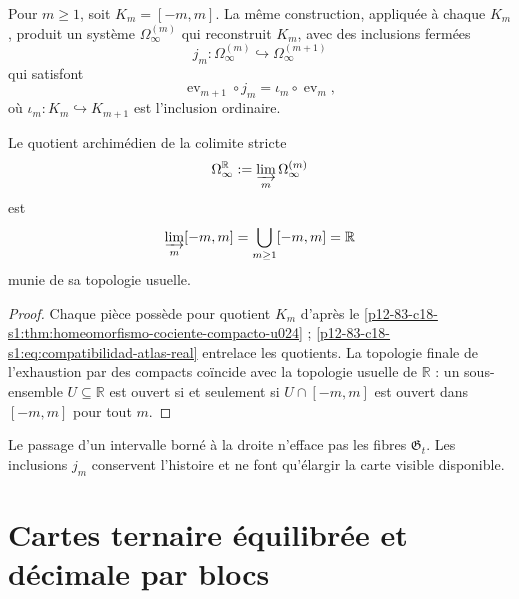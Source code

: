 Pour \(m\geq1\), soit \(K_m=[-m,m]\). La même construction, appliquée à chaque
\(K_m\), produit un système \(\Omega_\infty^{(m)}\) qui reconstruit
\(K_m\), avec des inclusions fermées
\begin{equation}
 j_m:\Omega_\infty^{(m)}\hookrightarrow
 \Omega_\infty^{(m+1)}
 \label{p12-83-c18-s1:eq:inclusion-atlas-genealogico}
\end{equation}
qui satisfont
\begin{equation}
 \operatorname{ev}_{m+1}\circ j_m
 =\iota_m\circ\operatorname{ev}_m,
 \label{p12-83-c18-s1:eq:compatibilidad-atlas-real}
\end{equation}
où \(\iota_m:K_m\hookrightarrow K_{m+1}\) est l'inclusion ordinaire.

\begin{proposition}
\label{p12-83-c18-s1:prop:agotamiento-recta-real-u024}
Le quotient archimédien de la colimite stricte
\begin{equation}
 \Omega_\infty^{\mathbb R}
 :=\varinjlim_m\Omega_\infty^{(m)}
 \label{p12-83-c18-s1:eq:colimite-historias-recta}
\end{equation}
est
\begin{equation}
 \varinjlim_m[-m,m]
 =\bigcup_{m\geq1}[-m,m]
 =\mathbb R
 \label{p12-83-c18-s1:eq:colimite-compactos-recta}
\end{equation}
munie de sa topologie usuelle.
\end{proposition}

\begin{proof}
Chaque pièce possède pour quotient \(K_m\) d'après le
\cref{p12-83-c18-s1:thm:homeomorfismo-cociente-compacto-u024} ;
\eqref{p12-83-c18-s1:eq:compatibilidad-atlas-real} entrelace les quotients. La topologie
finale de l'exhaustion par des compacts coïncide avec la topologie usuelle de
\(\mathbb R\) : un sous-ensemble \(U\subseteq\mathbb R\) est ouvert si et seulement
si \(U\cap[-m,m]\) est ouvert dans \([-m,m]\) pour tout \(m\).
\end{proof}

Le passage d'un intervalle borné à la droite n'efface pas les fibres
\(\mathfrak G_t\). Les inclusions \(j_m\) conservent l'histoire et ne font
qu'élargir la carte visible disponible.

\section{Cartes ternaire équilibrée et décimale par blocs}

